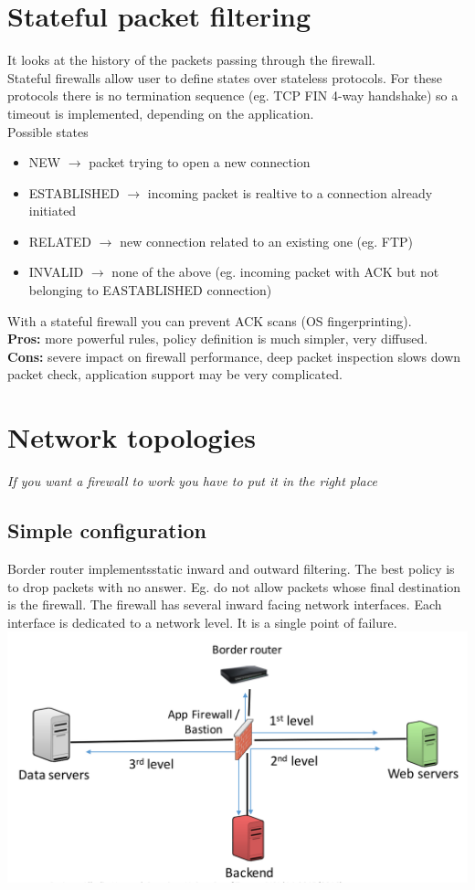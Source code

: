 \documentclass[10pt,a4paper]{book}
\begin{document}
\section{Stateful packet filtering}
It looks at the history of the packets passing through the firewall.\\
Stateful firewalls allow user to define states over stateless protocols. For these protocols there is no termination sequence (eg. TCP FIN 4-way handshake) so a timeout is implemented, depending on the application.\\
Possible states
\begin{itemize}
\item NEW $\to$ packet trying to open a new connection
\item ESTABLISHED $\to$ incoming packet is realtive to a connection already initiated
\item RELATED $\to$ new connection related to an existing one (eg. FTP)
\item INVALID $\to$ none of the above (eg. incoming packet with ACK  but not belonging to EASTABLISHED connection)
\end{itemize}
With a stateful firewall you can prevent ACK scans (OS fingerprinting).\\
\textbf{Pros:} more powerful rules, policy definition is much simpler, very diffused.\\
\textbf{Cons:} severe impact on firewall performance, deep packet inspection slows down packet check, application support may be very complicated.
\newpage
\section{Network topologies}
\emph{If you want a firewall to work you have to put it in the right place}
\subsection{Simple configuration}
Border router implementsstatic inward and outward filtering. The best policy is to drop packets with no answer. Eg. do not allow packets whose final destination is the firewall.  The firewall has several inward facing network interfaces. Each interface is dedicated to a network level. It is a single point of failure.\\
\includegraphics[scale=0.3]{firewall/simple.png}
\end{document}
